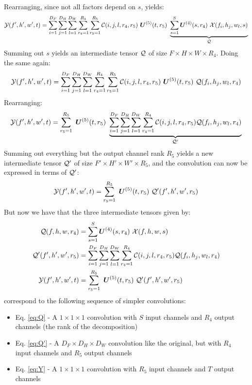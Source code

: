 Rearranging, since not all factors depend on $s$, yields:
\begin{equation}
    \mathcal{Y}(f', h', w', t) = \sum_{i=1}^{D_F} \sum_{j=1}^{D_H} \sum_{l=1}^{D_W} \sum_{r_{4}=1}^{R_{4}} \sum_{r_{5}=1}^{R_{5}} \mathcal{C}(i, j, l, r_{4}, r_{5}) \ \boldsymbol{U}^{(5)}(t, r_{5}) \ \underbrace{\sum_{s=1}^{S} \boldsymbol{U}^{(4)}(s, r_{4}) \ \mathcal{X}(f_i, h_j, w_l, s)}_{\large \mathcal{Q}}
\end{equation}
Summing out $s$ yields an intermediate tensor $\mathcal{Q}$ of size $F\times H \times W \times R_4$. Doing the same again:
\begin{equation}
    \mathcal{Y}(f', h', w', t) = \sum_{i=1}^{D_F} \sum_{j=1}^{D_H} \sum_{l=1}^{D_W} \sum_{r_{4}=1}^{R_{4}} \sum_{r_{5}=1}^{R_{5}} \mathcal{C}(i, j, l, r_{4}, r_{5}) \ \boldsymbol{U}^{(5)}(t, r_{5}) \  \mathcal{Q} (f_i, h_j, w_l, r_4)
\end{equation}
Rearranging:
\begin{equation}
    \tensor{Y}(f', h', w', t) = \sum_{r_{5}=1}^{R_{5}} \ \boldsymbol{U}^{(5)}(t, r_{5}) \ \underbrace{\sum_{i=1}^{D_F} \sum_{j=1}^{D_H} \sum_{l=1}^{D_W} \sum_{r_{4}=1}^{R_{4}} \tensor{C}(i, j, l, r_{4}, r_{5})   \tensor{Q} (f_i, h_j, w_l, r_4)}_{\large \tensor{Q}'}
\end{equation}
Summing out everything but the output channel rank $R_5$ yields a new intermediate tensor $\mathcal{Q}'$ of size $F' \times H' \times W' \times R_5$, and the convolution can now be expressed in terms of $\mathcal{Q}'$:
\begin{equation}
    \tensor{Y}(f', h', w', t) = \sum_{r_{5}=1}^{R_{5}} \ \boldsymbol{U}^{(5)}(t, r_{5}) \ \tensor{Q}'(f', h', w', r_5)
\end{equation}
But now we have that the three intermediate tensors given by:
\begin{align}
    \tensor{Q}(f, h, w, r_4) &= \sum_{s=1}^{S} \boldsymbol{U}^{(4)}(s, r_{4}) \ \tensor{X}(f, h, w, s) \label{eq:Q}\\
    \tensor{Q'}(f', h', w', r_5) &= \sum_{i=1}^{D_F} \sum_{j=1}^{D_H} \sum_{l=1}^{D_W} \sum_{r_{4}=1}^{R_{4}} \tensor{C}(i, j, l, r_{4}, r_{5})   \tensor{Q} (f_i, h_j, w_l, r_4) \label{eq:Q'} \\
    \tensor{Y}(f', h', w', t) &=  \sum_{r_{5}=1}^{R_{5}} \ \boldsymbol{U}^{(5)}(t, r_{5}) \ \tensor{Q}'(f', h', w', r_5) \label{eq:Y}
\end{align}
correspond to the following sequence of simpler convolutions:
\begin{itemize}
    \item Eq. \eqref{eq:Q} - A $1\times 1\times 1$ convolution with $S$ input channels and $R_4$ output channels (the rank of the decomposition)
    \item Eq. \eqref{eq:Q'} - A $D_F \times D_H \times D_W$ convolution like the original, but with $R_4$ input channels and $R_5$ output channels
    \item Eq. \eqref{eq:Y} - A $1\times 1\times 1$ convolution with $R_5$ input channels and $T$ output channels
\end{itemize}
